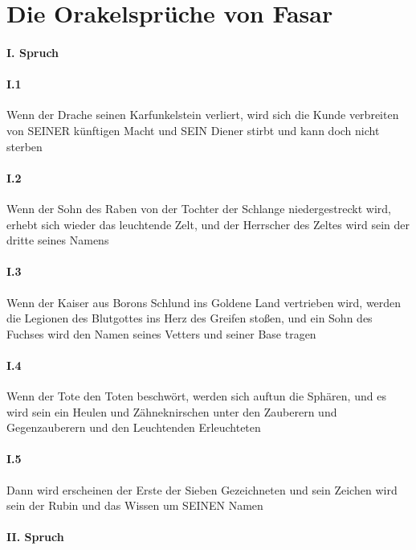 \section{Die Orakelsprüche von Fasar}

\paragraph{I. Spruch}

\paragraph{I.1} Wenn der Drache seinen Karfunkelstein verliert, wird sich die Kunde verbreiten von SEINER künftigen Macht und SEIN Diener stirbt und kann doch nicht sterben

\paragraph{I.2} Wenn der Sohn des Raben von der Tochter der Schlange niedergestreckt wird, erhebt sich wieder das leuchtende Zelt, und der Herrscher des Zeltes wird sein der dritte seines Namens

\paragraph{I.3} Wenn der Kaiser aus Borons Schlund ins Goldene Land vertrieben wird, werden die Legionen des Blutgottes ins Herz des Greifen stoßen, und ein Sohn des Fuchses wird den Namen seines Vetters und seiner Base tragen

\paragraph{I.4} Wenn der Tote den Toten beschwört, werden sich auftun die Sphären, und es wird sein ein Heulen und Zähneknirschen unter den Zauberern und Gegenzauberern und den Leuchtenden Erleuchteten

\paragraph{I.5} Dann wird erscheinen der Erste der Sieben Gezeichneten und sein Zeichen wird sein der Rubin und das Wissen um SEINEN Namen

\paragraph{II. Spruch}

